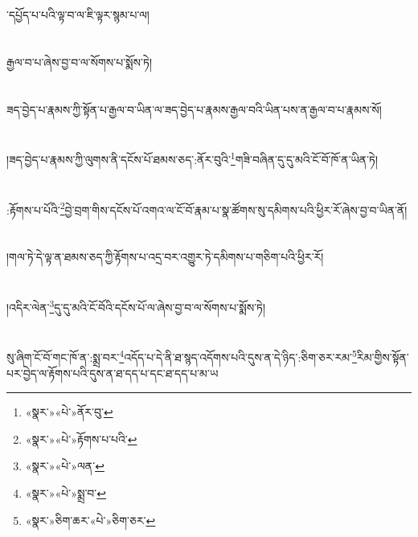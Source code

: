 ་དཔྱོད་པ་པའི་ལྟ་བ་ལ་ཇི་ལྟར་སྙམ་པ་ལ།\chapter{ }རྒྱལ་བ་པ་ཞེས་བྱ་བ་ལ་སོགས་པ་སྨོས་ཏེ།\chapter{ }ཟད་བྱེད་པ་རྣམས་ཀྱི་སྟོན་པ་རྒྱལ་བ་ཡིན་ལ་ཟད་བྱེད་པ་རྣམས་རྒྱལ་བའི་ཡིན་པས་ན་རྒྱལ་བ་པ་རྣམས་སོ།\chapter{ }།ཟད་བྱེད་པ་རྣམས་ཀྱི་ལུགས་ནི་དངོས་པོ་ཐམས་ཅད་:ནོར་བུའི་\footnote{«སྣར་»«པེ་»ནོར་བུ་}གཟི་བཞིན་དུ་དུ་མའི་ངོ་བོ་ཁོ་ན་ཡིན་ཏེ།\chapter{ }:རྟོགས་པ་པོའི་\footnote{«སྣར་»«པེ་»རྟོགས་པ་པའི་}བྱེ་བྲག་གིས་དངོས་པོ་འགའ་ལ་ངོ་བོ་རྣམ་པ་སྣ་ཚོགས་སུ་དམིགས་པའི་ཕྱིར་རོ་ཞེས་བྱ་བ་ཡིན་ནོ།\chapter{ }།གལ་ཏེ་དེ་ལྟ་ན་ཐམས་ཅད་ཀྱི་རྟོགས་པ་འདྲ་བར་འགྱུར་ཏེ་དམིགས་པ་གཅིག་པའི་ཕྱིར་རོ།\chapter{ }།འདིར་ལེན་\footnote{«སྣར་»«པེ་»ལན་}དུ་དུ་མའི་ངོ་བོའི་དངོས་པོ་ལ་ཞེས་བྱ་བ་ལ་སོགས་པ་སྨོས་ཏེ།\chapter{ }སུ་ཞིག་ངོ་བོ་གང་ཁོ་ན་:སྨྲ་བར་\footnote{«སྣར་»«པེ་»སྨྲ་བ་}འདོད་པ་དེ་ནི་ཐ་སྙད་འདོགས་པའི་དུས་ན་དེ་ཉིད་:ཅིག་ཅར་རམ་\footnote{«སྣར་»ཅིག་ཆར་«པེ་»ཅིག་ཅར་}རིམ་གྱིས་སྟོན་པར་བྱེད་ལ་རྟོགས་པའི་དུས་ན་ཐ་དད་པ་དང་ཐ་དད་པ་མ་ཡ